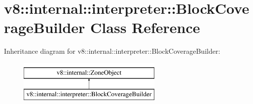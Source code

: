 \hypertarget{classv8_1_1internal_1_1interpreter_1_1BlockCoverageBuilder}{}\section{v8\+:\+:internal\+:\+:interpreter\+:\+:Block\+Coverage\+Builder Class Reference}
\label{classv8_1_1internal_1_1interpreter_1_1BlockCoverageBuilder}
Inheritance diagram for v8\+:\+:internal\+:\+:interpreter\+:\+:Block\+Coverage\+Builder\+:\begin{figure}[H]
\begin{center}
\leavevmode
\includegraphics[height=2.000000cm]{classv8_1_1internal_1_1interpreter_1_1BlockCoverageBuilder}
\end{center}
\end{figure}
